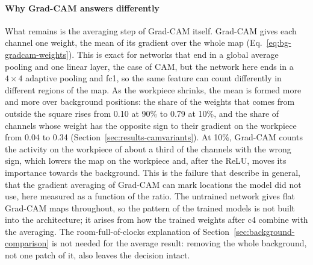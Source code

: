 \paragraph{Why Grad-CAM answers differently}
What remains is the averaging step of Grad-CAM itself. Grad-CAM gives each channel one
weight, the mean of its gradient over the whole map
(Eq.~\eqref{eq:bg-gradcam-weights}). This is exact for networks that end in a global
average pooling and one linear layer, the case of CAM, but the network here ends in a
$4 \times 4$ adaptive pooling and fc1, so the same feature can count differently in
different regions of the map. As the workpiece shrinks, the mean is formed more and more
over background positions: the share of the weights that comes from outside the square
rises from 0.10 at 90\% to 0.79 at 10\%, and the share of channels whose weight has the
opposite sign to their gradient on the workpiece from 0.04 to 0.34
(Section~\ref{sec:results-camvariants}). At 10\%, Grad-CAM counts the activity on the
workpiece of about a third of the channels with the wrong sign, which lowers the map on
the workpiece and, after the ReLU, moves its importance towards the background. This is the failure that \citet{draelos2021hirescam} describe in general, that the gradient averaging of
Grad-CAM can mark locations the model did not use, here measured as a function of the
ratio. The untrained network gives flat Grad-CAM maps throughout, so the pattern of the
trained models is not built into the architecture; it arises from how the trained
weights after c4 combine with the averaging. The room-full-of-clocks explanation of
Section~\ref{sec:background-comparison} is not needed for the average result: removing
the whole background, not one patch of it, also leaves the decision intact.

